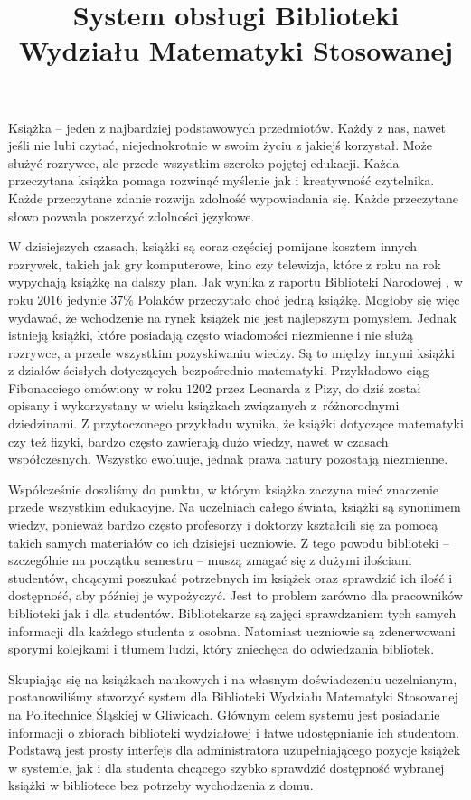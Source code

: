 \documentclass[twoside]{projektInzynierskiMS}
\title{System obsługi Biblioteki Wydziału Matematyki Stosowanej}
\begin{document}
Książka -- jeden z najbardziej podstawowych przedmiotów. Każdy z nas, nawet jeśli nie lubi czytać, niejednokrotnie w swoim życiu z jakiejś korzystał. Może służyć rozrywce, ale przede wszystkim szeroko pojętej edukacji. Każda przeczytana książka pomaga rozwinąć myślenie jak i kreatywność czytelnika. Każde przeczytane zdanie rozwija zdolność wypowiadania się. 
Każde przeczytane słowo pozwala poszerzyć zdolności językowe.

W dzisiejszych czasach, książki są coraz częściej pomijane kosztem innych rozrywek, takich jak gry komputerowe, kino czy telewizja, które z roku na rok wypychają książkę na dalszy plan. Jak wynika z raportu Biblioteki Narodowej \cite{raportBN}, w roku $2016$ jedynie $37\%$ Polaków przeczytało choć jedną książkę. Mogłoby się więc wydawać, że wchodzenie na rynek książek nie jest najlepszym pomysłem. Jednak istnieją książki, które posiadają często wiadomości niezmienne i nie służą rozrywce, a przede wszystkim pozyskiwaniu wiedzy. Są to między innymi książki z działów ścisłych dotyczących bezpośrednio matematyki. Przykładowo ciąg Fibonacciego omówiony w roku $1202$ przez Leonarda z Pizy, do dziś został opisany i wykorzystany w wielu książkach związanych z~różnorodnymi dziedzinami. Z przytoczonego przykładu wynika, że książki dotyczące matematyki czy też fizyki, bardzo często zawierają dużo wiedzy, nawet w czasach współczesnych. Wszystko ewoluuje, jednak prawa natury pozostają niezmienne.

Współcześnie doszliśmy do punktu, w którym książka zaczyna mieć znaczenie przede wszystkim edukacyjne. Na uczelniach całego świata, książki są synonimem wiedzy, ponieważ bardzo często profesorzy i doktorzy kształcili się za pomocą takich samych materiałów co ich dzisiejsi uczniowie. Z tego powodu biblioteki -- szczególnie na początku semestru -- muszą zmagać się z dużymi ilościami studentów, chcącymi poszukać potrzebnych im książek oraz sprawdzić ich ilość i dostępność, aby później je wypożyczyć. Jest to problem zarówno dla pracowników biblioteki jak i dla studentów. Bibliotekarze są zajęci sprawdzaniem tych samych informacji dla każdego studenta z osobna. Natomiast uczniowie są zdenerwowani sporymi kolejkami i tłumem ludzi, który zniechęca do odwiedzania bibliotek.

Skupiając się na książkach naukowych i na własnym doświadczeniu uczelnianym, postanowiliśmy stworzyć system dla Biblioteki Wydziału Matematyki Stosowanej na Politechnice Śląskiej w Gliwicach. Głównym celem systemu jest posiadanie informacji o zbiorach biblioteki wydziałowej i łatwe udostępnianie ich studentom. Podstawą jest prosty interfejs dla administratora uzupełniającego pozycje książek w systemie, jak i dla studenta chcącego szybko sprawdzić dostępność wybranej książki w bibliotece bez potrzeby wychodzenia z domu.
\end{document}

